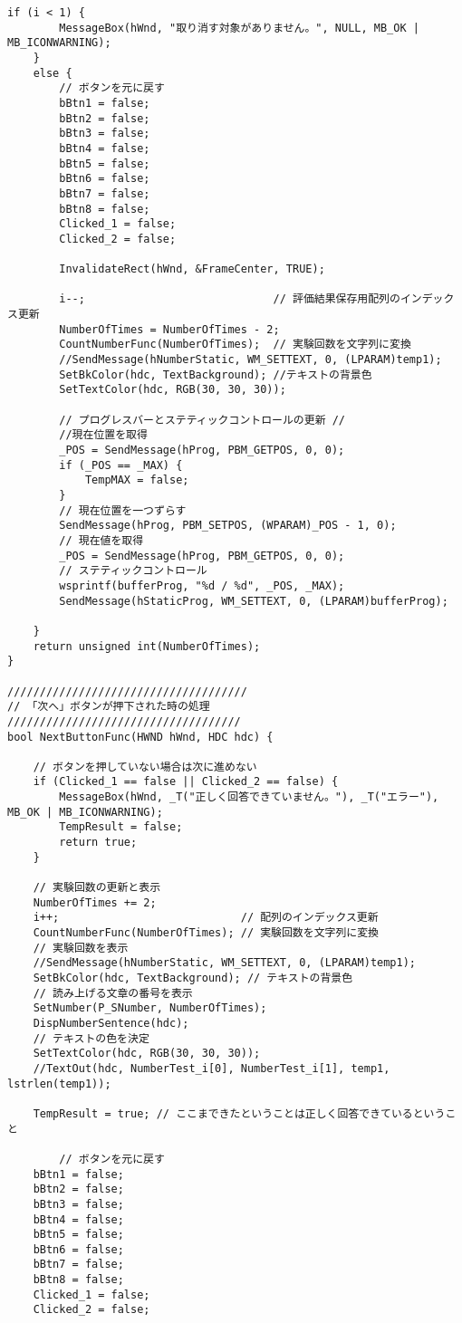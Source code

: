 \begin{lstlisting}[caption=main.cpp]
	if (i < 1) {
		MessageBox(hWnd, "取り消す対象がありません。", NULL, MB_OK | MB_ICONWARNING);
	}
	else {
		// ボタンを元に戻す
		bBtn1 = false;
		bBtn2 = false;
		bBtn3 = false;
		bBtn4 = false;
		bBtn5 = false;
		bBtn6 = false;
		bBtn7 = false;
		bBtn8 = false;
		Clicked_1 = false;
		Clicked_2 = false;

		InvalidateRect(hWnd, &FrameCenter, TRUE);

		i--;                             // 評価結果保存用配列のインデックス更新
		NumberOfTimes = NumberOfTimes - 2;
		CountNumberFunc(NumberOfTimes);  // 実験回数を文字列に変換
		//SendMessage(hNumberStatic, WM_SETTEXT, 0, (LPARAM)temp1);
		SetBkColor(hdc, TextBackground); //テキストの背景色
		SetTextColor(hdc, RGB(30, 30, 30));

		// プログレスバーとステティックコントロールの更新 //
		//現在位置を取得
		_POS = SendMessage(hProg, PBM_GETPOS, 0, 0); 
		if (_POS == _MAX) {
			TempMAX = false;
		}
		// 現在位置を一つずらす
		SendMessage(hProg, PBM_SETPOS, (WPARAM)_POS - 1, 0);
		// 現在値を取得
		_POS = SendMessage(hProg, PBM_GETPOS, 0, 0);
		// ステティックコントロール
		wsprintf(bufferProg, "%d / %d", _POS, _MAX);
		SendMessage(hStaticProg, WM_SETTEXT, 0, (LPARAM)bufferProg);

	}
	return unsigned int(NumberOfTimes);
}

/////////////////////////////////////
// 「次へ」ボタンが押下された時の処理
////////////////////////////////////
bool NextButtonFunc(HWND hWnd, HDC hdc) {

	// ボタンを押していない場合は次に進めない
	if (Clicked_1 == false || Clicked_2 == false) {
		MessageBox(hWnd, _T("正しく回答できていません。"), _T("エラー"), MB_OK | MB_ICONWARNING);
		TempResult = false;
		return true;
	}

	// 実験回数の更新と表示
	NumberOfTimes += 2;
	i++;                            // 配列のインデックス更新
	CountNumberFunc(NumberOfTimes); // 実験回数を文字列に変換
	// 実験回数を表示
	//SendMessage(hNumberStatic, WM_SETTEXT, 0, (LPARAM)temp1);
	SetBkColor(hdc, TextBackground); // テキストの背景色
	// 読み上げる文章の番号を表示
	SetNumber(P_SNumber, NumberOfTimes);
	DispNumberSentence(hdc);
	// テキストの色を決定
	SetTextColor(hdc, RGB(30, 30, 30));
	//TextOut(hdc, NumberTest_i[0], NumberTest_i[1], temp1, lstrlen(temp1));
	
	TempResult = true; // ここまできたということは正しく回答できているということ

		// ボタンを元に戻す
	bBtn1 = false;
	bBtn2 = false;
	bBtn3 = false;
	bBtn4 = false;
	bBtn5 = false;
	bBtn6 = false;
	bBtn7 = false;
	bBtn8 = false;
	Clicked_1 = false;
	Clicked_2 = false;


\end{lstlisting}
